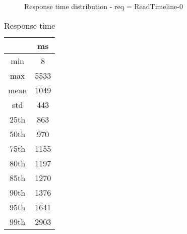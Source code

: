 \begin{minipage}{0.75\linewidth}
\begin{figure}[h]
\begin{adjustbox}{max width=1.0\linewidth, keepaspectratio}
  \end{adjustbox}
  \caption{Response time distribution - req = ReadTimeline-0}
\end{figure}
\end{minipage}\hfill\begin{minipage}{0.18\linewidth}
\begin{table}[h]
\begin{tabular}{|cc|}
\hline
\textbf{} & \textbf{ms}\\ \hline
 \Xhline{0.005\arrayrulewidth}
min & 8\\
 \Xhline{0.005\arrayrulewidth}
max & 5533\\
 \Xhline{0.005\arrayrulewidth}
mean & 1049\\
 \Xhline{0.005\arrayrulewidth}
std & 443\\
\hline
\hline
 \Xhline{0.005\arrayrulewidth}
25th & 863\\
 \Xhline{0.005\arrayrulewidth}
50th & 970\\
 \Xhline{0.005\arrayrulewidth}
75th & 1155\\
 \Xhline{0.005\arrayrulewidth}
80th & 1197\\
 \Xhline{0.005\arrayrulewidth}
85th & 1270\\
 \Xhline{0.005\arrayrulewidth}
90th & 1376\\
 \Xhline{0.005\arrayrulewidth}
95th & 1641\\
 \Xhline{0.005\arrayrulewidth}
99th & 2903\\
\hline
\end{tabular}
\caption{Response time}
\end{table}
\end{minipage}\hfill